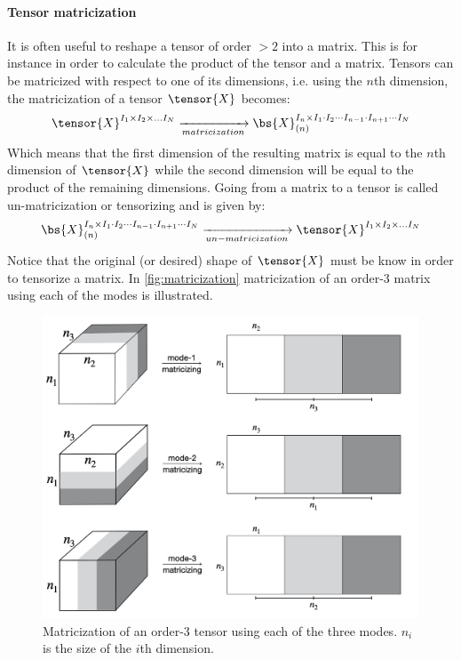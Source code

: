 \paragraph{Tensor matricization}
It is often useful to reshape a tensor of order $> 2$ into a matrix. This is for instance in order to calculate the product of the tensor and a matrix. Tensors can be matricized with respect to one of its dimensions, i.e. using the $n$th dimension, the matricization of a tensor $\tensor{X}$ becomes:
\begin{equation}
    \tensor{X}^{I_1 \times I_2 \times \dots I_N} \xrightarrow[matricization]{} \bs{X}_{(n)}^{I_n \times I_1 \cdot I_2 \cdots I_{n-1} \cdot I_{n+1} \cdots I_N}
\end{equation}
Which means that the first dimension of the resulting matrix is equal to the $n$th dimension of $\tensor{X}$ while the second dimension will be equal to the product of the remaining dimensions. Going from a matrix to a tensor is called un-matricization or tensorizing and is given by:
\begin{equation}
      \bs{X}_{(n)}^{I_n \times I_1 \cdot I_2 \cdots I_{n-1} \cdot I_{n+1} \cdots I_N} \xrightarrow[un-matricization]{} \tensor{X}^{I_1 \times I_2 \times \dots I_N}
\end{equation}
Notice that the original (or desired) shape of $\tensor{X}$ must be know in order to tensorize a matrix. In \autoref{fig:matricization} matricization of an order-3 matrix using each of the modes is illustrated.
\begin{figure}
    \centering
    \captionsetup{width=.8\linewidth}
    \includegraphics[width=.8\linewidth]{Pics/02_Theory/matricization.jpeg}
    \caption{Matricization of an order-3 tensor using each of the three modes. $n_i$ is the size of the $i$th dimension.}
    \label{fig:matricization}
\end{figure}

